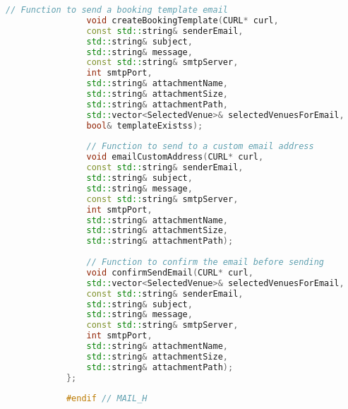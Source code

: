 \documentclass{article}
\begin{document}
\begin{mdframed}[backgroundcolor=background, hidealllines=false, innerleftmargin=15pt, innerrightmargin=5pt, innertopmargin=0pt, innerbottommargin=-5pt, linecolor=accent]
\begin{lstlisting}[language=C++]
				// Function to send a booking template email
				void createBookingTemplate(CURL* curl,
				const std::string& senderEmail,
				std::string& subject,
				std::string& message,
				const std::string& smtpServer,
				int smtpPort,
				std::string& attachmentName,
				std::string& attachmentSize,
				std::string& attachmentPath,
				std::vector<SelectedVenue>& selectedVenuesForEmail,
				bool& templateExistss);
				
				// Function to send to a custom email address
				void emailCustomAddress(CURL* curl,
				const std::string& senderEmail,
				std::string& subject,
				std::string& message,
				const std::string& smtpServer,
				int smtpPort,
				std::string& attachmentName,
				std::string& attachmentSize,
				std::string& attachmentPath);
				
				// Function to confirm the email before sending
				void confirmSendEmail(CURL* curl,
				std::vector<SelectedVenue>& selectedVenuesForEmail,
				const std::string& senderEmail,
				std::string& subject,
				std::string& message,
				const std::string& smtpServer,
				int smtpPort,
				std::string& attachmentName,
				std::string& attachmentSize,
				std::string& attachmentPath);
			};
			
			#endif // MAIL_H
		\end{lstlisting}
	\end{mdframed}
	
\end{document}
